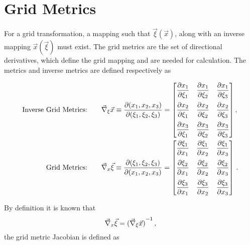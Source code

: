 \section{Grid Metrics}
For a grid transformation, a mapping such that $\vec{\xi}(\vec{x})$, along with an inverse mapping $\vec{x}(\vec{\xi})$ must exist. The grid metrics are the set of directional derivatives, which define the grid mapping and are needed for calculation. The metrics and inverse metrics are defined respectively as
\begin{center}
  \begin{align*}
    \text{Inverse Grid Metrics:} \qquad&
    \vecnabla_{\xi} \vecx \equiv \fpartial{(x_1,x_2,x_3)}{(\xi_1,\xi_2,\xi_3)}{1} =
    \begin{bmatrix}
      \displaystyle\fpartial{x_1}{\xi_1}{1} & \displaystyle\fpartial{x_1}{\xi_2}{1} & \displaystyle\fpartial{x_1}{\xi_3}{1}\\[2.5ex]
      \displaystyle\fpartial{x_2}{\xi_1}{1} & \displaystyle\fpartial{x_2}{\xi_2}{1} & \displaystyle\fpartial{x_2}{\xi_3}{1}\\[2.5ex]
      \displaystyle\fpartial{x_3}{\xi_1}{1} & \displaystyle\fpartial{x_3}{\xi_2}{1} & \displaystyle\fpartial{x_3}{\xi_3}{1}
    \end{bmatrix}, \\
    \text{Grid Metrics:} \qquad&
    \vecnabla_{x} \vecxi \equiv \fpartial{(\xi_1,\xi_2,\xi_3)}{(x_1,x_2,x_3)}{1} = 
    \begin{bmatrix}
      \displaystyle\fpartial{\xi_1}{x_1}{1} & \displaystyle\fpartial{\xi_1}{x_2}{1} & \displaystyle\fpartial{\xi_1}{x_3}{1}\\[2.5ex]
      \displaystyle\fpartial{\xi_2}{x_1}{1} & \displaystyle\fpartial{\xi_2}{x_2}{1}& \displaystyle\fpartial{\xi_2}{x_3}{1}\\[2.5ex]
      \displaystyle\fpartial{\xi_3}{x_1}{1} & \displaystyle\fpartial{\xi_3}{x_2}{1}& \displaystyle\fpartial{\xi_3}{x_3}{1}
    \end{bmatrix}\,.
  \end{align*}
\end{center}
By definition it is known that
\begin{equation*}
  {\vec{\nabla}}_{x} {\vec{\xi}} = {({\vec{\nabla}}_{\xi} {\vec{x}})}^{-1}\,,
\end{equation*}
the grid metric Jacobian is defined as 
